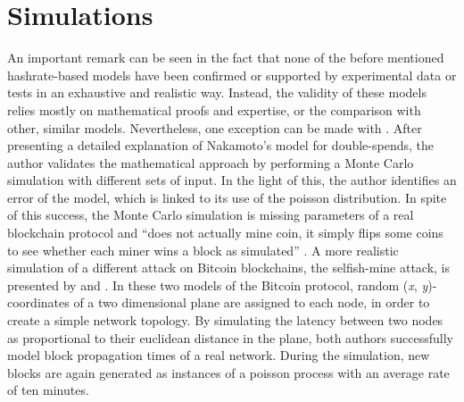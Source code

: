 \documentclass[a4paper,12pt,twoside]{report}
\begin{document}
\section{Simulations}
An important remark can be seen in the fact that none of the before mentioned hashrate-based models have been confirmed or supported by experimental data or tests in an exhaustive and realistic way. Instead, the validity of these models relies mostly on mathematical proofs and expertise, or the comparison with other, similar models. Nevertheless, one exception can be made with \cite{NakamotoExplMCSim}. After presenting a detailed explanation of Nakamoto's model for double-spends, the author validates the mathematical approach by performing a Monte Carlo simulation \cite{montecarlo} with different sets of input. In the light of this, the author identifies an error of the model, which is linked to its use of the poisson distribution. In spite of this success, the Monte Carlo simulation is missing parameters of a real blockchain protocol and ``does not actually
mine coin, it simply flips some coins to see whether each miner wins a block as simulated'' \cite{NakamotoExplMCSim}. A more realistic simulation of a different attack on Bitcoin blockchains, the selfish-mine attack, is presented by \cite{mwalemodel} and \cite{selfishmine2}. In these two models of the Bitcoin protocol, random (\textit{x}, \textit{y})-coordinates of a two dimensional plane are assigned to each node, in order to create a simple network topology. By simulating the latency between two nodes as proportional to their euclidean distance in the plane, both authors successfully model block propagation times of a real network. During the simulation, new blocks are again generated as instances of a poisson process with an average rate of ten minutes. 
\end{document}
